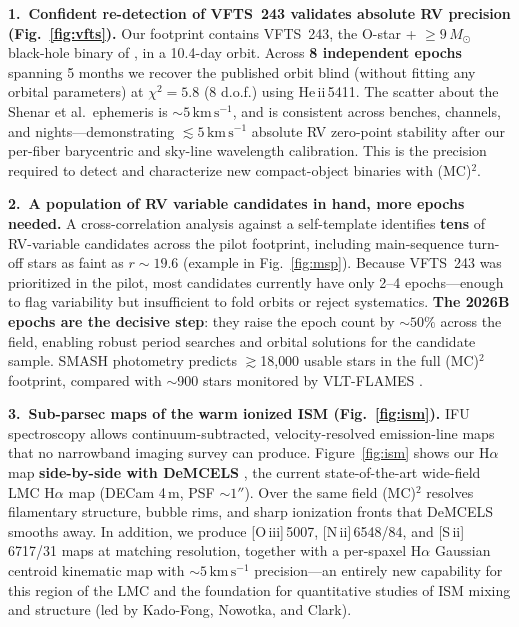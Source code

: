\documentclass[12pt]{article}
\newcommand{\ms}{\ensuremath{M_{\odot}}}
\newcommand{\kms}{\ensuremath{\mathrm{km}\,\mathrm{s}^{-1}}}
\begin{document}
\noindent\textbf{1.~Confident re-detection of VFTS~243 validates absolute RV precision (Fig.~\ref{fig:vfts}).} Our footprint contains VFTS~243, the O-star + $\ge 9\,\ms$ black-hole binary of \citet{shenar2022}, in a 10.4-day orbit. Across \textbf{8 independent epochs} spanning 5 months we recover the published orbit blind (without fitting any orbital parameters) at $\chi^2=5.8$ (8 d.o.f.) using He\,{\sc ii}\,5411. The scatter about the Shenar et al.\ ephemeris is $\sim5\,\kms$, and is consistent across benches, channels, and nights---demonstrating $\lesssim5\,\kms$ absolute RV zero-point stability after our per-fiber barycentric and sky-line wavelength calibration. This is the precision required to detect and characterize new compact-object binaries with \textsc{\textsf{(MC)$^2$}}.

\noindent\textbf{2.~A population of RV variable candidates in hand, more epochs needed.} A cross-correlation analysis against a self-template identifies \textbf{tens} of RV-variable candidates across the pilot footprint, including main-sequence turn-off stars as faint as $r\sim19.6$ (example in Fig.~\ref{fig:msp}). Because VFTS~243 was prioritized in the pilot, most candidates currently have only 2--4 epochs---enough to flag variability but insufficient to fold orbits or reject systematics. \textbf{The 2026B epochs are the decisive step}: they raise the epoch count by $\sim50\%$ across the field, enabling robust period searches and orbital solutions for the candidate sample. SMASH photometry \citep{nidever2017} predicts $\gtrsim$18{,}000 usable stars in the full (MC)$^2$ footprint, compared with $\sim$900 stars monitored by VLT-FLAMES \citep{vlt_flames}.

\noindent\textbf{3.~Sub-parsec maps of the warm ionized ISM (Fig.~\ref{fig:ism}).} IFU spectroscopy allows continuum-subtracted, velocity-resolved emission-line maps that no narrowband imaging survey can produce. Figure~\ref{fig:ism} shows our H$\alpha$ map \textbf{side-by-side with DeMCELS} \citep{points2024}, the current state-of-the-art wide-field LMC H$\alpha$ map (DECam 4\,m, PSF $\sim1''$). Over the same field (MC)$^2$ resolves filamentary structure, bubble rims, and sharp ionization fronts that DeMCELS smooths away. In addition, we produce [O\,{\sc iii}]\,5007, [N\,{\sc ii}]\,6548/84, and [S\,{\sc ii}]\,6717/31 maps at matching resolution, together with a per-spaxel H$\alpha$ Gaussian centroid kinematic map with $\sim5\,\kms$ precision---an entirely new capability for this region of the LMC and the foundation for quantitative studies of ISM mixing and structure (led by Kado-Fong, Nowotka, and Clark).
\end{document}
